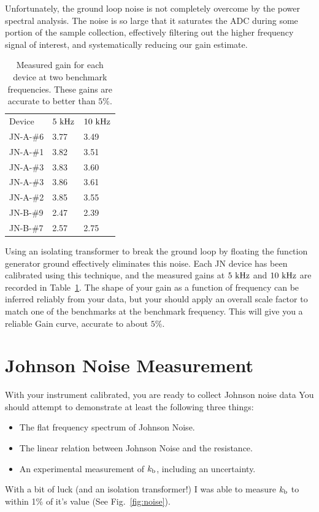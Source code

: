 \documentclass[12pt]{article}
\newcommand{\kb}{k_{\rm b}}
\begin{document}
Unfortunately, the ground loop noise is not completely overcome by the power spectral analysis.   The noise is so large that it saturates the ADC during some portion of the sample collection, effectively filtering out the higher frequency signal of interest, and systematically reducing our gain estimate.

\begin{table}[htbp]
\begin{center}
\begin{tabular}{lll}
Device & $5~\rm kHz$ & $10~\rm kHz$ \\ 
JN-A-\#6 & 3.77 & 3.49 \\
JN-A-\#1 & 3.82 & 3.51 \\
JN-A-\#3 & 3.83 & 3.60 \\
JN-A-\#3 & 3.86 & 3.61 \\
JN-A-\#2 & 3.85 & 3.55 \\
JN-B-\#9 & 2.47 & 2.39 \\
JN-B-\#7 & 2.57 & 2.75 \\
\end{tabular}
\end{center}
\caption{\label{tbl:gain} Measured gain for each device at two benchmark frequencies.   These gains are accurate to better than $5\%$.}
\end{table}

Using an isolating transformer to break the ground loop by floating the function generator ground effectively eliminates this noise.  Each JN device has been calibrated using this technique, and the measured gains at $5~\rm kHz$ and $10~\rm kHz$ are recorded in Table~\ref{tbl:gain}.  The shape of your gain as a function of frequency can be inferred reliably from your data, but your should apply an overall scale factor to match one of the benchmarks at the benchmark frequency.  This will give you a reliable Gain curve, accurate to about $5\%$.

\section{Johnson Noise Measurement}

With your instrument calibrated, you are ready to collect Johnson noise data
You should attempt to demonstrate at least the following three things:
\begin{itemize}
\item The flat frequency spectrum of Johnson Noise.
\item The linear relation between Johnson Noise and the resistance. 
\item An experimental measurement of $\kb$, including an uncertainty.
\end{itemize}
With a bit of luck (and an isolation transformer!) I was able to measure $\kb$ to within 1\% of it's value (See Fig.~\ref{fig:noise}).
\end{document}
